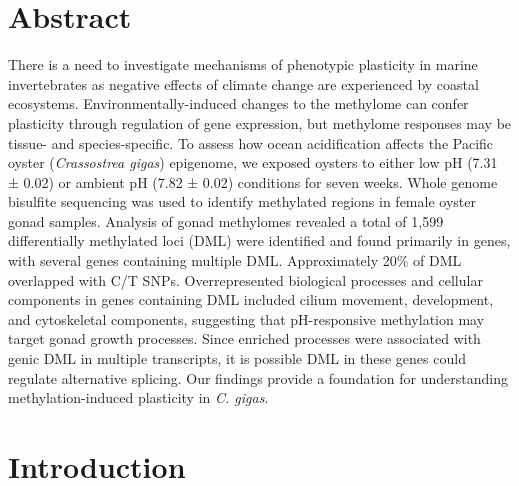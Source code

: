 \documentclass [11pt, proquest] {uwthesis}[2015/03/03]
\begin{document}
\hypertarget{abstract-2}{%
\section{Abstract}\label{abstract-2}}

There is a need to investigate mechanisms of phenotypic plasticity in marine invertebrates as negative effects of climate change are experienced by coastal ecosystems. Environmentally-induced changes to the methylome can confer plasticity through regulation of gene expression, but methylome responses may be tissue- and species-specific. To assess how ocean acidification affects the Pacific oyster (\emph{Crassostrea gigas}) epigenome, we exposed oysters to either low pH (7.31 ± 0.02) or ambient pH (7.82 ± 0.02) conditions for seven weeks. Whole genome bisulfite sequencing was used to identify methylated regions in female oyster gonad samples. Analysis of gonad methylomes revealed a total of 1,599 differentially methylated loci (DML) were identified and found primarily in genes, with several genes containing multiple DML. Approximately 20\% of DML overlapped with C/T SNPs. Overrepresented biological processes and cellular components in genes containing DML included cilium movement, development, and cytoskeletal components, suggesting that pH-responsive methylation may target gonad growth processes. Since enriched processes were associated with genic DML in multiple transcripts, it is possible DML in these genes could regulate alternative splicing. Our findings provide a foundation for understanding methylation-induced plasticity in \emph{C. gigas}.

\hypertarget{introduction-3}{%
\section{Introduction}\label{introduction-3}}
\end{document}
